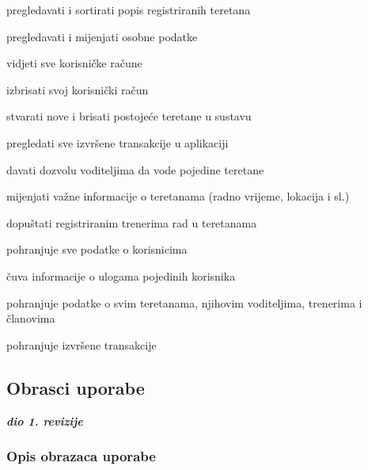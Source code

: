 \begin{packed_enum}
\begin{packed_enum}
				\item pregledavati i sortirati popis registriranih teretana
				\item pregledavati i mijenjati osobne podatke
				\item vidjeti sve korisničke račune
				\item izbrisati svoj korisnički račun
				\item stvarati nove i brisati postojeće teretane u sustavu
				\item pregledati sve izvršene transakcije u aplikaciji
				\item davati dozvolu  voditeljima da vode pojedine teretane
				\item mijenjati važne informacije o teretanama (radno vrijeme, lokacija i sl.)
				\item dopuštati registriranim trenerima rad u teretanama
				
			\end{packed_enum}
			
			
			\item  {}
			
			\begin{packed_enum}
				
				\item pohranjuje sve podatke o korisnicima
				\item čuva informacije o ulogama pojedinih korisnika
				\item pohranjuje podatke o svim teretanama, njihovim voditeljima, trenerima i članovima
				\item pohranjuje izvršene transakcije
				
			\end{packed_enum}
			
		\end{packed_enum}
		
		\eject
				
			\subsection{Obrasci uporabe}
				
				\textbf{\textit{dio 1. revizije}}
				
				\subsubsection{Opis obrazaca uporabe}

